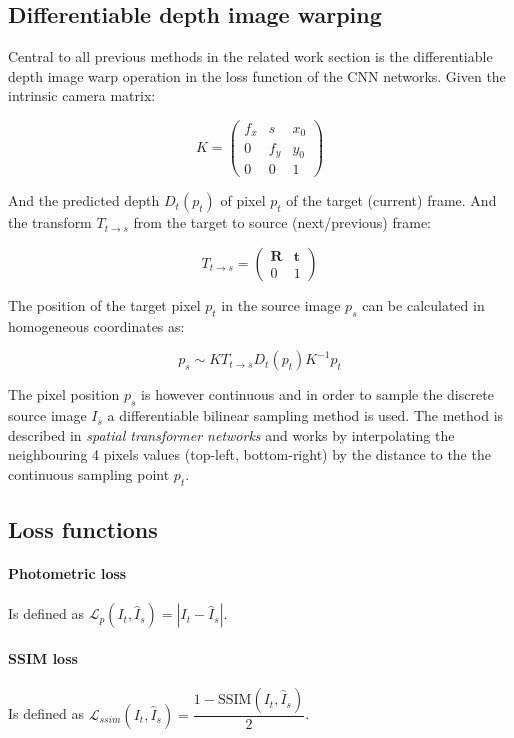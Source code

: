 \subsection{Differentiable depth image warping}
\label{sec:diffwarp}

Central to all previous methods in the related work section is the differentiable depth image warp operation in the loss function of the CNN networks. Given the intrinsic camera matrix:

\[
K = 
\begin{pmatrix}
f_x & s & x_0 \\
0 & f_y & y_0 \\
0 & 0   & 1
\end{pmatrix}
\]

And the predicted depth $ D_t(p_t) $ of pixel $ p_t $ of the target (current) frame. And the transform $ T_{t \rightarrow s} $ from the target to source (next/previous) frame:

\[
T_{t \rightarrow s} =
\begin{pmatrix}
\textbf{R} & \textbf{t} \\
0 & 1
\end{pmatrix}
\]

The position of the target pixel $ p_t $ in the source image $ p_s $ can be calculated in homogeneous coordinates as:

\[
p_s \sim K T_{t \rightarrow s} D_t(p_t) K^{-1} p_t 
\]

The pixel position $ p_s $ is however continuous and in order to sample the discrete source image $ I_s $ a differentiable bilinear sampling method is used. The method is described in \textit{spatial transformer networks}\cite{spatialtransformernetworks} and works by interpolating the neighbouring 4 pixels values (top-left, bottom-right) by the distance to the the continuous sampling point $ p_t $.

\subsection{Loss functions}
\label{sec:loss}

\paragraph{Photometric loss} Is defined as $ \mathcal{L}_p(I_t, \hat{I}_s)=|I_t - \hat{I}_s| $.

\paragraph{SSIM loss} Is defined as $ \mathcal{L}_{ssim}(I_t, \hat{I}_s)=\dfrac{1-\textrm{SSIM}(I_t, \hat{I}_s)}{2} $.

